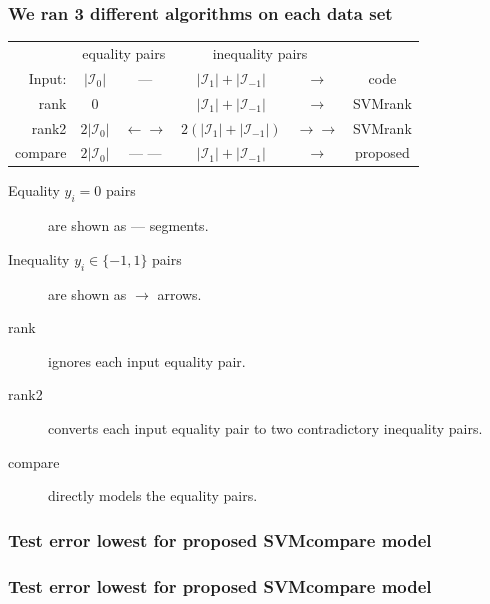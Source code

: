 \documentclass{beamer}
\begin{document}
\begin{frame}
  \frametitle{We ran 3 different algorithms on each data set}
  \begin{center}
        \begin{tabular}{r|cc|cc|c|}
&    \multicolumn{2}{c|}{equality pairs}
&    \multicolumn{2}{c|}{inequality pairs}\\
Input:    & $|\mathcal I_0|$ %
    & --- 
    & $|\mathcal I_1|+|\mathcal I_{-1}|$ %
    & $\rightarrow$ &
    code
    \\
    \hline
    rank 
    & 0 
    & 
    & $|\mathcal I_1|+|\mathcal I_{-1}|$ 
    & $\rightarrow$ &
    SVMrank
    \\
    \hline
    rank2 
    & $2|\mathcal I_0|$ 
    & $\leftarrow \rightarrow$
    & $2(|\mathcal I_1|+|\mathcal I_{-1}|)$ 
    & $\rightarrow \rightarrow$ &
    SVMrank
    \\
    \hline
    compare 
    & $2|\mathcal I_0|$ 
    & --- --- 
    & $|\mathcal I_1|+|\mathcal I_{-1}|$ 
    & $\rightarrow$ &
    proposed
    \\
    \hline
  \end{tabular}
  \end{center}
  \begin{description}
  \item[Equality $y_i=0$ pairs] are shown as ---  
    segments.
  \item[Inequality $y_i\in\{-1,1\}$ pairs]
    are shown as $\rightarrow$  arrows.
  \item[rank] ignores each input equality pair.
  \item[rank2] converts each input equality pair
    to two contradictory inequality pairs.
  \item[compare] directly models the equality pairs.
  \end{description}
\end{frame}



\begin{frame}
  \frametitle{Test error lowest for proposed SVMcompare model}
  \begin{minipage}{1.0\linewidth}
    \hskip -0.5cm
      
  \end{minipage}
\end{frame}

\begin{frame}
  \frametitle{Test error lowest for proposed SVMcompare model}
  \begin{minipage}{1.0\linewidth}
    \hskip -0.5cm
      
  \end{minipage}
\end{frame}
\end{document}
